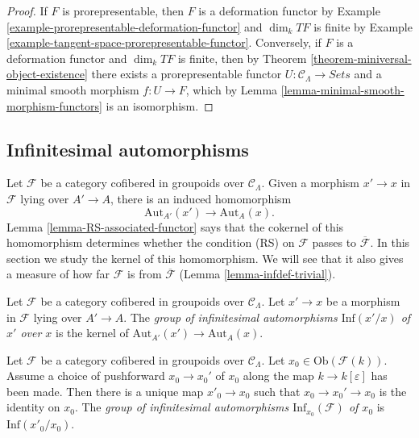 \begin{proof}
If $F$ is prorepresentable, then $F$ is a deformation functor by Example 
\ref{example-prorepresentable-deformation-functor} and $\dim_k TF$ is finite by 
Example \ref{example-tangent-space-prorepresentable-functor}.  Conversely, if 
$F$ is a deformation functor and $\dim_k TF$ is finite, then by Theorem 
\ref{theorem-miniversal-object-existence} there exists a prorepresentable 
functor $U: \mathcal{C}_\Lambda \to \textit{Sets}$ and a minimal 
smooth morphism $f: U \to F$, which by Lemma 
\ref{lemma-minimal-smooth-morphism-functors} is an isomorphism.
\end{proof}

\subsection{Infinitesimal automorphisms}
\label{subsection-infinitesimal-automorphisms}

\noindent
Let $\mathcal{F}$ be a category cofibered in groupoids over $\mathcal 
C_\Lambda$. Given a morphism $x' \to x$ in $\mathcal{F}$ lying over 
$A' \to A$, there is an induced homomorphism
\[ \text{Aut}_{A'}(x') \to \text{Aut}_{A}(x). \]
Lemma \ref{lemma-RS-associated-functor} says that the cokernel of this 
homomorphism determines whether the condition (RS) on $\mathcal{F}$ passes to 
$\overline{\mathcal{F}}$. In this section we study the kernel of this 
homomorphism. We will see that it also gives a measure of how far $\mathcal{F}$ 
is from $\overline{\mathcal{F}}$ (Lemma \ref{lemma-infdef-trivial}).  

\begin{definition}
\label{definition-relative-infinitesimal-auts}
Let $\mathcal{F}$ be a category cofibered in groupoids over $\mathcal 
C_\Lambda$. Let $x' \to x$ be a morphism in $\mathcal{F}$ lying over 
$A' \to A$. The {\it group of infinitesimal automorphisms 
$\text{Inf}({x'/x})$ of $x'$ over $x$} is the kernel of 
$\text{Aut}_{A'}(x') \to \text{Aut}_{A}(x)$.
\end{definition}

\begin{definition}
\label{definition-infinitesimal-auts}
Let $\mathcal{F}$ be a category cofibered in groupoids over $\mathcal 
C_\Lambda$. Let $x_0 \in \text{Ob}(\mathcal{F}(k))$. Assume a choice of 
pushforward $x_0 \to x_0'$ of $x_0$ along the map $k \to 
k[\varepsilon]$ has been made.  Then there is a unique map $x'_0 \to 
x_0$ such that $x_0 \to x_0' \to x_0$ is the identity on $x_0$. 
The {\it group of infinitesimal automorphisms $\text{Inf}_{x_0}(\mathcal 
F)$ of $x_0$} is $\text{Inf}(x'_0/x_0)$.
\end{definition}


